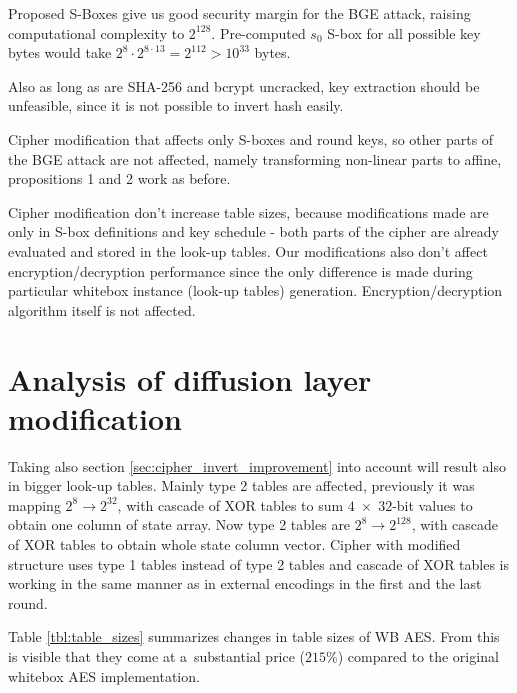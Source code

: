 \documentclass[11pt,oneside,final]{fithesis2}
\begin{document}
    Proposed S-Boxes give us good security margin for the BGE attack, raising computational complexity to $2^{128}$. 
    Pre-computed $s_0$ S-box for all possible key bytes would take $2^8 \cdot 2^{8\cdot13} = 2^{112} > 10^{33}$ bytes. 

    Also as long as are SHA-256 and bcrypt uncracked, key extraction should be unfeasible, since it is not possible to invert hash easily. 

    Cipher modification that affects only S-boxes and round keys, so other parts of the BGE attack are not affected, namely transforming non-linear parts
    to affine, propositions 1 and 2 work as before. 

    Cipher modification don't increase table sizes, because modifications made are only in S-box definitions and key schedule - both 
    parts of the cipher are already evaluated and stored in the look-up tables. Our modifications also don't affect encryption/decryption performance since the only
    difference is made during particular whitebox instance (look-up tables) generation. Encryption/decryption algorithm itself is not affected.
    
    \section{Analysis of diffusion layer modification}
    Taking also section \ref{sec:cipher_invert_improvement} into account will result also in bigger look-up tables. Mainly type 2 tables are affected, previously 
    it was mapping $2^8 \rightarrow 2^{32}$, with cascade of XOR tables to sum $4 \; \times\; 32$-bit values to obtain one column of state array. Now type 2 tables are
    $2^8 \rightarrow 2^{128}$, with cascade of XOR tables to obtain whole state column vector. Cipher with modified structure uses type 1 tables instead of type 2 tables
    and cascade of XOR tables is working in the same manner as in external encodings in the first and the last round.

    Table \ref{tbl:table_sizes} summarizes changes in table sizes of WB AES. From this is visible that
    they come at a~substantial price ($215\%$) compared to the original whitebox AES implementation.
    
\end{document}

